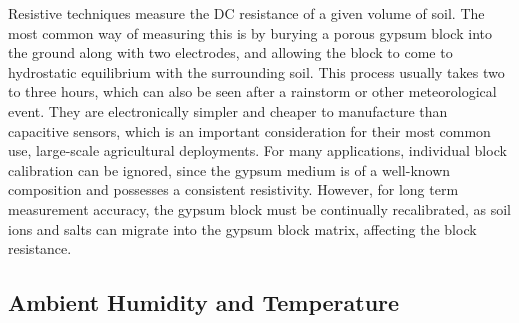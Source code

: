 
Resistive techniques measure the DC resistance of a given volume of soil. The most common way of measuring this is by burying a porous gypsum block into the ground along with two electrodes, and allowing the block to come to hydrostatic equilibrium with the surrounding soil. This process usually takes two to three hours, which can also be seen after a rainstorm or other meteorological event. They are electronically simpler and cheaper to manufacture than capacitive sensors, which is an important consideration for their most common use, large-scale agricultural deployments. For many applications, individual block calibration can be ignored, since the gypsum medium is of a well-known composition and possesses a consistent resistivity. However, for long term measurement accuracy, the gypsum block must be continually recalibrated, as soil ions and salts can migrate into the gypsum block matrix, affecting the block resistance.


\subsection{Ambient Humidity and Temperature}
